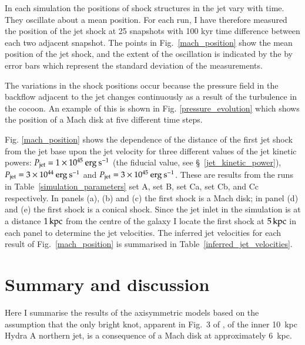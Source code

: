 In each simulation the positions of shock structures in the jet vary with time. They oscillate about a mean position. For each run, I have therefore measured the position of the jet shock at 25 snapshots with 100 kyr time difference between each two adjacent snapshot. The points in Fig.~\ref{mach_position} show the mean position of the jet shock, and the extent of the oscillation is indicated by the by error bars which represent the standard deviation of the measurements. 

The variations in the shock positions occur because the pressure field in the backflow adjacent to the jet changes continuously as a result of the turbulence in the cocoon. An example of this is shown in Fig. \ref{pressure_evolution} which shows the position of a Mach disk at five different time steps.

Fig. \ref{mach_position} shows the dependence of the distance of the first jet shock from the jet base upon the jet velocity for three different values of the jet kinetic powers: $P_{\rm{jet}}=1\times10^{45} \rm \> erg \> s^{-1}$ (the fiducial value, see \S~\ref{jet_kinetic_power}), $P_{\rm{jet}}=3\times10^{44} \rm \> erg \> s^{-1}$ and $P_{\rm{jet}}=3\times10^{45} \rm \> erg \> s^{-1}$. These are results from the runs in Table~\ref{simulation_parameters} set A, set B, set Ca, set Cb, and Cc respectively. In panels (a), (b) and (c) the first shock is a Mach disk; in panel (d) and (e) the first shock is a conical shock.
Since the jet inlet in the simulation is at a distance $1 \, \rm kpc$ from the centre of the galaxy I locate the first shock at $5 \, \rm kpc$ in each panel to determine the jet velocities. The inferred jet velocities for each result of Fig.~\ref{mach_position} is summarised in Table~\ref{inferred_jet_velocities}.


\section{Summary and discussion}
Here I summarise the results of the axisymmetric models based on the assumption that the only bright knot, apparent in Fig.~3 of \citet{taylor90}, of the inner 10~kpc Hydra A northern jet, is a consequence of a Mach disk at approximately 6~kpc. 

